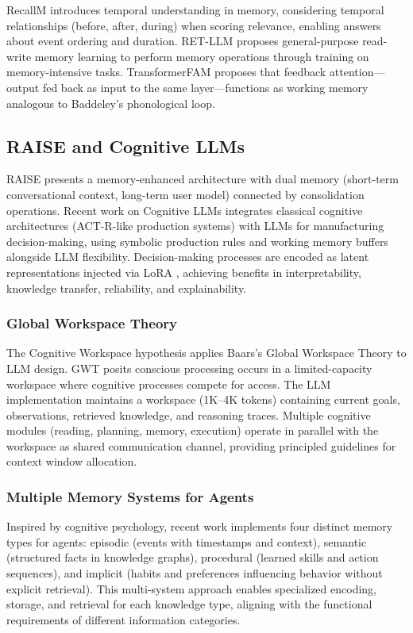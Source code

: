 \documentclass[11pt,letterpaper]{article}
\begin{document}
RecallM \cite{kynoch2023recallm} introduces temporal understanding in memory, considering temporal relationships (before, after, during) when scoring relevance, enabling answers about event ordering and duration. RET-LLM \cite{modarressi2024retllm} proposes general-purpose read-write memory learning to perform memory operations through training on memory-intensive tasks. TransformerFAM \cite{irie2024transformerfam} proposes that feedback attention---output fed back as input to the same layer---functions as working memory analogous to Baddeley's phonological loop.

\subsection{RAISE and Cognitive LLMs}

RAISE \cite{liu2024raise} presents a memory-enhanced architecture with dual memory (short-term conversational context, long-term user model) connected by consolidation operations. Recent work on Cognitive LLMs integrates classical cognitive architectures (ACT-R-like production systems) with LLMs for manufacturing decision-making, using symbolic production rules and working memory buffers alongside LLM flexibility. Decision-making processes are encoded as latent representations injected via LoRA \cite{hu2022lora}, achieving benefits in interpretability, knowledge transfer, reliability, and explainability.

\subsubsection{Global Workspace Theory}

The Cognitive Workspace hypothesis applies Baars's Global Workspace Theory to LLM design. GWT posits conscious processing occurs in a limited-capacity workspace where cognitive processes compete for access. The LLM implementation maintains a workspace (1K--4K tokens) containing current goals, observations, retrieved knowledge, and reasoning traces. Multiple cognitive modules (reading, planning, memory, execution) operate in parallel with the workspace as shared communication channel, providing principled guidelines for context window allocation.

\subsubsection{Multiple Memory Systems for Agents}

Inspired by cognitive psychology, recent work implements four distinct memory types for agents: episodic (events with timestamps and context), semantic (structured facts in knowledge graphs), procedural (learned skills and action sequences), and implicit (habits and preferences influencing behavior without explicit retrieval). This multi-system approach enables specialized encoding, storage, and retrieval for each knowledge type, aligning with the functional requirements of different information categories.
\end{document}
